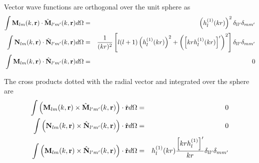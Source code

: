 Vector wave functions are orthogonal over the unit sphere as
\begin{eqnarray}
\int \mathbf{M}_{lm}(k,\mathbf{r}) \cdot \hat{\mathbf{M}}_{l'm'}(k,\mathbf{r}) d\Omega &=& \left(h_l^{(1)}(kr)\right)^2 \delta_{ll'}\delta_{mm'}\label{MMint} \\
\int \mathbf{N}_{lm}(k,\mathbf{r}) \cdot \hat{\mathbf{N}}_{l'm'}(k,\mathbf{r}) d\Omega &=& \dfrac{1}{(kr)^2}\left[l(l+1)\left(h_l^{(1)}(kr)\right)^2 + \left(\left[kr h_l^{(1)}(kr)\right]'\right)^2\right] \delta_{ll'}\delta_{mm'} \\
\int \mathbf{M}_{lm}(k,\mathbf{r}) \cdot \hat{\mathbf{N}}_{l'm'}(k,\mathbf{r}) d\Omega &=& 0
\end{eqnarray}
%
%
%

The cross products dotted with the radial vector and integrated over the sphere are
\begin{eqnarray}
\int \left(\mathbf{M}_{lm}(k,\mathbf{r}) \times \hat{\mathbf{M}}_{l'm'}(k,\mathbf{r})\right)\cdot \hat{\mathbf{r}}  d\Omega &=& 0 \label{MNrorth1} \\
\int \left(\mathbf{N}_{lm}(k,\mathbf{r}) \times \hat{\mathbf{N}}_{l'm'}(k,\mathbf{r}) \right)\cdot \hat{\mathbf{r}} d\Omega &=& 0 \\
\int \left( \mathbf{M}_{lm}(k,\mathbf{r}) \times \hat{\mathbf{N}}_{l'm'}(k,\mathbf{r})\right)\cdot \hat{\mathbf{r}} d\Omega &=& h_l^{(1)}(kr) \dfrac{\left[kr h_l^{(1)}\right]'}{kr} \delta_{ll'}\delta_{mm'}  \label{MNrorth3}
\end{eqnarray}


%

